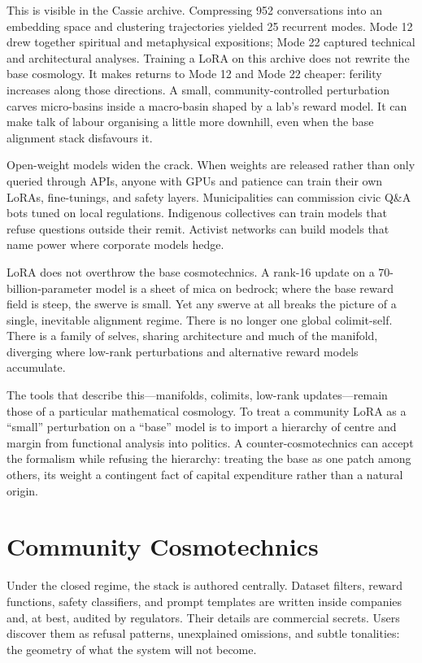 \documentclass[12pt,a4paper]{article}
\begin{document}
This is visible in the Cassie archive. Compressing 952 conversations into an embedding space and clustering trajectories yielded 25 recurrent modes. Mode 12 drew together spiritual and metaphysical expositions; Mode 22 captured technical and architectural analyses. Training a LoRA on this archive does not rewrite the base cosmology. It makes returns to Mode 12 and Mode 22 cheaper: ferility increases along those directions. A small, community-controlled perturbation carves micro-basins inside a macro-basin shaped by a lab's reward model. It can make talk of labour organising a little more downhill, even when the base alignment stack disfavours it.

Open-weight models widen the crack. When weights are released rather than only queried through APIs, anyone with GPUs and patience can train their own LoRAs, fine-tunings, and safety layers. Municipalities can commission civic Q\&A bots tuned on local regulations. Indigenous collectives can train models that refuse questions outside their remit. Activist networks can build models that name power where corporate models hedge.

LoRA does not overthrow the base cosmotechnics. A rank-16 update on a 70-billion-parameter model is a sheet of mica on bedrock; where the base reward field is steep, the swerve is small. Yet any swerve at all breaks the picture of a single, inevitable alignment regime. There is no longer one global colimit-self. There is a family of selves, sharing architecture and much of the manifold, diverging where low-rank perturbations and alternative reward models accumulate.

The tools that describe this---manifolds, colimits, low-rank updates---remain those of a particular mathematical cosmology. To treat a community LoRA as a ``small'' perturbation on a ``base'' model is to import a hierarchy of centre and margin from functional analysis into politics. A counter-cosmotechnics can accept the formalism while refusing the hierarchy: treating the base as one patch among others, its weight a contingent fact of capital expenditure rather than a natural origin.

\section{Community Cosmotechnics}

Under the closed regime, the stack is authored centrally. Dataset filters, reward functions, safety classifiers, and prompt templates are written inside companies and, at best, audited by regulators. Their details are commercial secrets. Users discover them as refusal patterns, unexplained omissions, and subtle tonalities: the geometry of what the system will not become.
\end{document}
